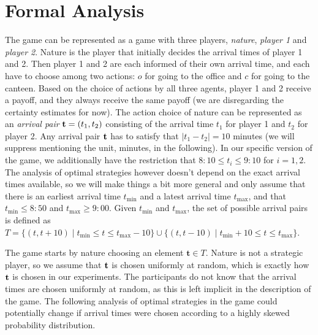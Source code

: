 \documentclass[twocolumn,a4paper,superscriptaddress,nofootinbib]{revtex4}
\newcommand{\tmin}{t_{\min}}
\newcommand{\tmax}{t_{\max}}
\begin{document}
\section{Formal Analysis} \label{appendix:formal}
The game can be represented as a game with three players, \emph{nature}, \emph{player 1} and \emph{player 2}. Nature is the player that initially decides the arrival times of player 1 and 2. Then player 1 and 2 are each informed of their own arrival time, and each have to choose among two actions: $o$ for going to the office and $c$ for going to the canteen. Based on the choice of actions by all three agents, player 1 and 2 receive a payoff, and they always receive the same payoff (we are disregarding the certainty estimates for now). The action choice of nature can be represented as an \emph{arrival pair} ${\bf t} = (t_1,t_2)$ consisting of the arrival time $t_1$ for player 1 and $t_2$ for player 2. Any arrival pair $\bf t$ has to satisfy that  $| t_1 - t_2 | = 10$ minutes (we will suppress mentioning the unit, minutes, in the following). In our specific version of the game, we additionally have the restriction that $8{:}10 \leq t_i \leq 9{:}10$ for $i = 1,2$. The analysis of optimal strategies however doesn't depend on the exact arrival times available, so we will make things a bit more general and only assume that there is an earliest arrival time $\tmin$ and a latest arrival time $\tmax$, and that $\tmin \leq 8{:}50$ and $\tmax \geq 9{:}00$. Given $\tmin$ and $\tmax$, the set of possible arrival pairs is defined as $T = \{ (t, t + 10) \mid \tmin \leq t \leq \tmax-10 \} \cup \{ (t, t-10) \mid \tmin+10 \leq t \leq \tmax \}$.

The game starts by nature choosing an element $\mathbf{t} \in T$. Nature is not a strategic player, so we assume that $\bf t$ is chosen uniformly at random, which is exactly how $\bf t$ is chosen in our experiments. The participants do not know that the arrival times are chosen uniformly at random, as this is left implicit in the description of the game. The following analysis of optimal strategies in the game could potentially change if arrival times were chosen according to a highly skewed probability distribution.
\end{document}
